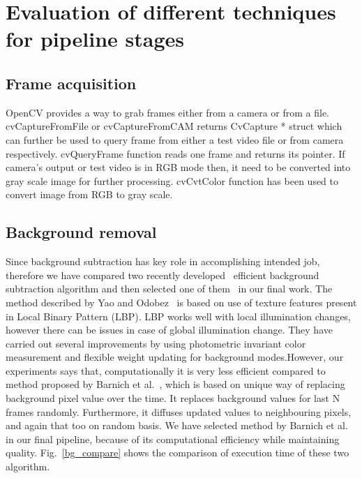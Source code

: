 \section {Evaluation of different techniques for pipeline stages}
\subsection{Frame acquisition}
\indent OpenCV provides a way to grab frames either from a camera or
from a file. cvCaptureFromFile or cvCaptureFromCAM returns CvCapture *
struct which can further be used to query frame from either a test video
file or from camera respectively. cvQueryFrame function reads one frame
and returns its pointer. If camera's output or test video is in RGB mode
then, it need to be converted into gray scale image for further
processing. cvCvtColor function has been used to convert image from RGB
to gray scale.
\subsection{Background removal}
\indent Since background subtraction has key role in accomplishing
intended job, therefore we have compared two recently developed~\cite{3,
5} efficient background subtraction algorithm and then selected one of
them~\cite{5} in our final work.  The method described by Yao and
Odobez~\cite{3} is based on use of texture features present in Local
Binary Pattern (LBP).  LBP works well with local illumination changes,
however there can be issues in case of global illumination change. They
have carried out several improvements by using photometric invariant
color measurement and flexible weight updating for background
modes.However, our experiments says that, computationally it is very
less efficient compared to method proposed by Barnich et al.~\cite{9},
which is based on unique way of replacing background pixel value over
the time. It replaces background values for last N frames randomly.
Furthermore, it diffuses updated values to neighbouring pixels, and
again that too on random basis. We have selected method by Barnich et
al.~\cite{9} in our final pipeline, because of its computational
efficiency while maintaining quality.  Fig.~\ref{bg_compare} shows the
comparison of execution time of these two algorithm.

